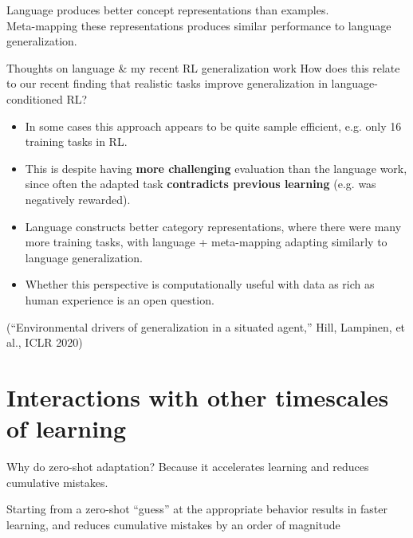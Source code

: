 \documentclass{beamer}
\begin{document}
\begin{frame}[standout]
Language produces better concept representations than examples.\\[1em]
Meta-mapping these representations produces similar performance to language generalization.
\end{frame}

\begin{frame}{Thoughts on language \& my recent RL generalization work}
How does this relate to our recent finding that realistic tasks improve generalization in language-conditioned RL?\par
\begin{itemize}[<+(1)->]
\item In some cases this approach appears to be quite sample efficient, e.g. only 16 training tasks in RL.
\item This is despite having \textbf{more challenging} evaluation than the language work, since often the adapted task \textbf{contradicts previous learning} (e.g. was negatively rewarded). 
\item Language constructs better category representations, where there were many more training tasks, with language + meta-mapping adapting similarly to language generalization. 
\item Whether this perspective is computationally useful with data as rich as human experience is an open question.
\end{itemize}
(``Environmental drivers of generalization in a situated agent,'' Hill, Lampinen, et al., ICLR 2020)
\end{frame}

\section{Interactions with other timescales of learning}

\begin{frame}{Why do zero-shot adaptation?}
Because it accelerates learning and reduces cumulative mistakes.
{
\centering
{}
}
\end{frame}

\begin{frame}[standout]
Starting from a zero-shot ``guess'' at the appropriate behavior results in faster learning, and reduces cumulative mistakes by an order of magnitude 
\end{frame}
\end{document}
